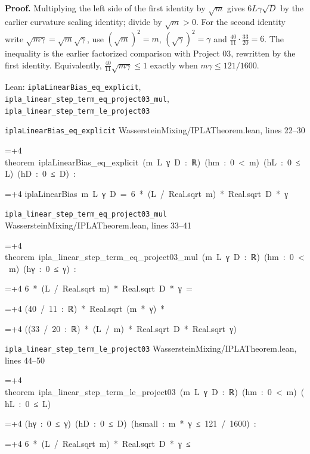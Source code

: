 \documentclass[11pt,a4paper]{article}
\newlength{\leancharwidth}
\newenvironment{leancode}{\par\smallskip\begingroup\ttfamily\footnotesize\raggedright
  \settowidth{\leancharwidth}{M}\setlength{\parskip}{0pt}\setlength{\parindent}{0pt}
  \frenchspacing}{\par\endgroup\smallskip}
\newcommand{\leanline}[2]{\hangindent=\dimexpr#1\leancharwidth+4\leancharwidth\relax
  \hangafter=1\noindent\hspace*{#1\leancharwidth}#2\par}
\newcommand{\leansource}[1]{\par{\footnotesize\color{leanmuted}#1}\par}
\begin{document}
\textbf{Proof.} Multiplying the left side of the first identity by \(\sqrt m\) gives \(6L\gamma\sqrt D\) by the earlier curvature scaling identity; divide by \(\sqrt m>0\). For the second identity write \(\sqrt{m\gamma}=\sqrt m\sqrt\gamma\), use \((\sqrt m)^2=m\), \((\sqrt\gamma)^2=\gamma\) and \(\frac{40}{11}\cdot\frac{33}{20}=6\). The inequality is the earlier factorized comparison with Project 03, rewritten by the first identity. Equivalently, \(\frac{40}{11}\sqrt{m\gamma}\le1\) exactly when \(m\gamma\le121/1600\).

\begin{leanbox}{Lean: \texttt{iplaLinearBias\_\allowbreak{}eq\_\allowbreak{}explicit}, \texttt{ipla\_\allowbreak{}linear\_\allowbreak{}step\_\allowbreak{}term\_\allowbreak{}eq\_\allowbreak{}project03\_\allowbreak{}mul}, \texttt{ipla\_\allowbreak{}linear\_\allowbreak{}step\_\allowbreak{}term\_\allowbreak{}le\_\allowbreak{}project03}}
\leansource{\texttt{iplaLinearBias\_\allowbreak{}eq\_\allowbreak{}explicit} \quad WassersteinMixing/\allowbreak{}IPLATheorem.lean, lines 22–30}
\begin{leancode}
\leanline{0}{theorem\ iplaLinearBias\_eq\_explicit\ (m\ L\ γ\ D\ :\ ℝ)\ (hm\ :\ 0\ <\ m)\ (hL\ :\ 0\ ≤\ L)\ (hD\ :\ 0\ ≤\ D)\ :}
\leanline{4}{iplaLinearBias\ m\ L\ γ\ D\ =\ 6\ *\ (L\ /\ Real.sqrt\ m)\ *\ Real.sqrt\ D\ *\ γ}
\end{leancode}
\leansource{\texttt{ipla\_\allowbreak{}linear\_\allowbreak{}step\_\allowbreak{}term\_\allowbreak{}eq\_\allowbreak{}project03\_\allowbreak{}mul} \quad WassersteinMixing/\allowbreak{}IPLATheorem.lean, lines 33–41}
\begin{leancode}
\leanline{0}{theorem\ ipla\_linear\_step\_term\_eq\_project03\_mul\ (m\ L\ γ\ D\ :\ ℝ)\ (hm\ :\ 0\ <\ m)\ (hγ\ :\ 0\ ≤\ γ)\ :}
\leanline{4}{6\ *\ (L\ /\ Real.sqrt\ m)\ *\ Real.sqrt\ D\ *\ γ\ =}
\leanline{6}{(40\ /\ 11\ :\ ℝ)\ *\ Real.sqrt\ (m\ *\ γ)\ *}
\leanline{8}{((33\ /\ 20\ :\ ℝ)\ *\ (L\ /\ m)\ *\ Real.sqrt\ D\ *\ Real.sqrt\ γ)}
\end{leancode}
\leansource{\texttt{ipla\_\allowbreak{}linear\_\allowbreak{}step\_\allowbreak{}term\_\allowbreak{}le\_\allowbreak{}project03} \quad WassersteinMixing/\allowbreak{}IPLATheorem.lean, lines 44–50}
\begin{leancode}
\leanline{0}{theorem\ ipla\_linear\_step\_term\_le\_project03\ (m\ L\ γ\ D\ :\ ℝ)\ (hm\ :\ 0\ <\ m)\ (hL\ :\ 0\ ≤\ L)}
\leanline{4}{(hγ\ :\ 0\ ≤\ γ)\ (hD\ :\ 0\ ≤\ D)\ (hsmall\ :\ m\ *\ γ\ ≤\ 121\ /\ 1600)\ :}
\leanline{4}{6\ *\ (L\ /\ Real.sqrt\ m)\ *\ Real.sqrt\ D\ *\ γ\ ≤}

\end{leancode}
\end{leanbox}
\end{document}
